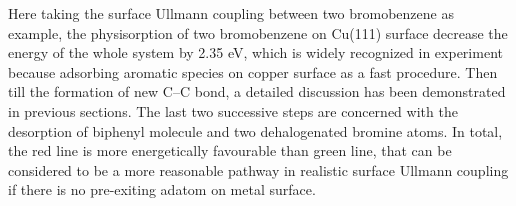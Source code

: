 \documentclass[%
 reprint,
 amsmath,amssymb,
 aps,
prb,
]{revtex4-2}
\begin{document}
Here taking the surface Ullmann coupling between two bromobenzene as example, the physisorption of two bromobenzene on Cu(111) surface decrease the energy of the whole system by 2.35 eV, which is widely recognized in experiment because adsorbing aromatic species on copper surface as a fast procedure. 
Then till the formation of new C--C bond, a detailed discussion has been demonstrated in previous sections. The last two successive steps are concerned with the desorption of biphenyl molecule and two dehalogenated bromine atoms. 
In total, the red line is more energetically favourable than green line, that can be considered to be a more reasonable pathway in realistic surface Ullmann coupling if there is no pre-exiting adatom on metal surface.



\end{document}
